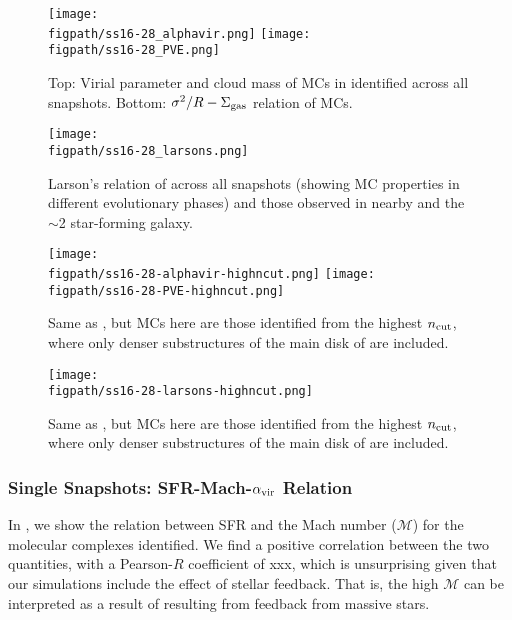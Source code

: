 \documentclass[apj]{emulateapj} %
\begin{document}


\begin{figure*}[htbp]
\centering
\texttt{[image: \\figpath/ss16-28\_alphavir.png]}  
\texttt{[image: \\figpath/ss16-28\_PVE.png]}
\caption{
Top: Virial parameter and cloud mass of MCs in \flower identified across all snapshots.
Bottom: $\sigma^2/R - \Sigma_{\rm gas}$ relation of MCs.
\label{fig:alpha16-28}}
\end{figure*}

\begin{figure*}[htbp]
\centering
\texttt{[image: \\figpath/ss16-28\_larsons.png]}  
\caption{
Larson's relation of \flower across all snapshots (showing MC properties in different evolutionary 
phases) and 
those observed in nearby and the \z$\sim$2 star-forming galaxy.
\label{fig:larsons16-28}}
\end{figure*}


\begin{figure*}[htbp]
\centering
\texttt{[image: \\figpath/ss16-28-alphavir-highncut.png]}
\texttt{[image: \\figpath/ss16-28-PVE-highncut.png]}
\caption{
Same as , but MCs here are those identified from the highest $n_{\rm cut}$,
where only denser substructures of the main disk of \flower are included. 
\label{fig:alpha16-28-highncut}}
\end{figure*}

\begin{figure*}[htbp]
\centering
\texttt{[image: \\figpath/ss16-28-larsons-highncut.png]}  
\caption{
Same as , but MCs here are those identified from the highest $n_{\rm cut}$,
where only denser substructures of the main disk of \flower are included. 
\label{fig:larsons16-28-highncut}}
\end{figure*}




\subsubsection{Single Snapshots: SFR-Mach-$\alpha_{\rm vir}$ Relation}
In \Fig{}, we show the relation between SFR and the Mach number ($\mathcal{M}$) for the molecular 
complexes identified. 
We find a positive correlation between the two quantities, with a Pearson-$R$ coefficient of xxx, 
which is unsurprising given that our simulations include the effect of stellar feedback. That is, 
the high $\mathcal{M}$ can be interpreted as a result of \SF resulting from feedback from 
massive stars.
\end{document}
